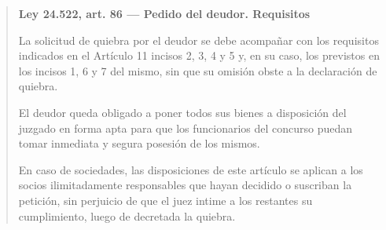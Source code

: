 \documentclass[12pt,oneside]{book}
\newenvironment{articulo}[1]
  {\begin{quote}\small\textbf{#1}\par\smallskip}
  {\end{quote}}
\begin{document}
\begin{articulo}{Ley 24.522, art. 86 --- Pedido del deudor. Requisitos}
La solicitud de quiebra por el deudor se debe acompañar con los requisitos indicados en el Artículo 11 incisos 2, 3, 4 y 5 y, en su caso, los previstos en los incisos 1, 6 y 7 del mismo, sin que su omisión obste a la declaración de quiebra.

El deudor queda obligado a poner todos sus bienes a disposición del juzgado en forma apta para que los funcionarios del concurso puedan tomar inmediata y segura posesión de los mismos.

En caso de sociedades, las disposiciones de este artículo se aplican a los socios ilimitadamente responsables que hayan decidido o suscriban la petición, sin perjuicio de que el juez intime a los restantes su cumplimiento, luego de decretada la quiebra.
\end{articulo}
\end{document}
